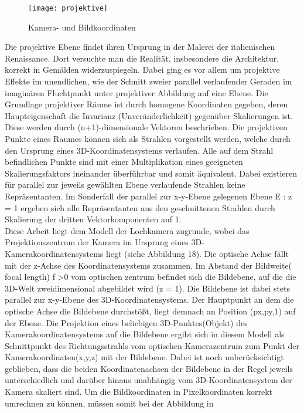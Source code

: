 \documentclass[11pt]{scrartcl}
\begin{document}
\begin{figure}[H]
  \texttt{[image: projektive]}
  \caption{Kamera- und Bildkoordinaten}
\end{figure}

\noindent
Die projektive Ebene findet ihren Ursprung in der Malerei der italienischen
Renaissance. Dort versuchte man die Realität, insbesondere die Architektur, korrekt
in Gemälden widerzuspiegeln. Dabei ging es vor allem um projektive Effekte im
unendlichen, wie der Schnitt zweier parallel verlaufender Geraden im imaginären
Fluchtpunkt unter projektiver Abbildung auf eine Ebene.
Die Grundlage projektiver Räume ist durch homogene Koordinaten gegeben, deren
Haupteigenschaft die Invarianz (Unveränderlichkeit) gegenüber Skalierungen ist.
Diese werden durch (n+1)-dimensionale Vektoren beschrieben. Die projektiven
Punkte eines Raumes können sich als Strahlen vorgestellt werden, welche durch
den Ursprung eines 3D-Koordinatensystems verlaufen. Alle auf dem Strahl
befindlichen Punkte sind mit einer Multiplikation eines geeigneten Skalierungsfaktors
ineinander überführbar und somit äquivalent. Dabei existieren für parallel zur jeweils
gewählten Ebene verlaufende Strahlen keine Repräsentanten. Im Sonderfall der
parallel zur x-y-Ebene gelegenen Ebene E : z = 1 ergeben sich alle Repräsentanten
aus den geschnittenen Strahlen durch Skalierung der dritten Vektorkomponenten auf
1.
\\
Diese Arbeit liegt dem Modell der Lochkamera zugrunde, wobei das
Projektionszentrum der Kamera im Ursprung eines 3D-Kamerakoordinatensystems
liegt (siehe Abbildung 18). Die optische Achse fällt mit der z-Achse des
Koordinatensystems zusammen. Im Abstand der Bildweite( focal length) f \textgreater 0 vom
optischen zentrum befindet sich die Bildebene, auf die die 3D-Welt zweidimensional
abgebildet wird (z = 1). Die Bildebene ist dabei stets parallel zur x-y-Ebene des
3D-Koordinatensystems. Der Hauptpunkt an dem die optische Achse die Bildebene
durchstößt, liegt demnach an Position (px,py,1) auf der Ebene. Die Projektion eines
beliebigen 3D-Punktes(Objekt) des Kamerakoordinatensystems auf die Bildebene
ergibt sich in diesem Modell als Schnittpunkt des Richtungsstrahls vom optischen
Kamerazentrum zum Punkt der Kamerakoordinaten(x,y,z) mit der Bildebene. Dabei
ist noch unberücksichtigt geblieben, dass die beiden Koordinatenachsen der
Bildebene in der Regel jeweils unterschiedlich und darüber hinaus unabhängig vom
3D-Koordinatensystem der Kamera skaliert sind. Um die Bildkoordinaten in
Pixelkoordinaten korrekt umrechnen zu können, müssen somit bei der Abbildung in
\end{document}
